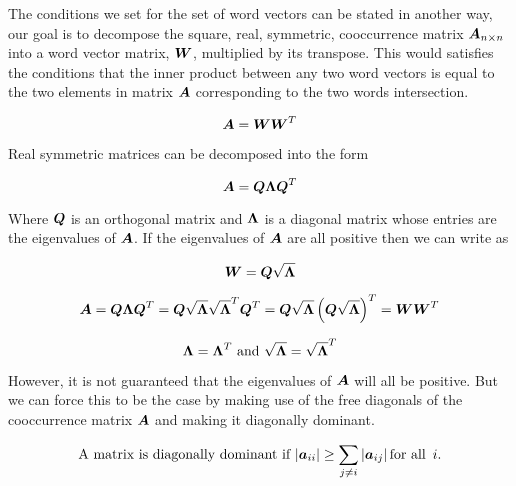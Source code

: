 \documentclass{article}
\begin{document}
%
%

The conditions we set for the set of word vectors can be stated in another way, our goal is to decompose the square, real, symmetric, cooccurrence matrix $\boldsymbol{{A}}_{{n} \times {n}}$ into a word vector matrix, $\boldsymbol{W}$, multiplied by its transpose. This would satisfies the conditions that the inner product between any two word vectors is equal to the two elements in matrix $\boldsymbol{A}$ corresponding to the two words intersection.

\begin{equation*}
\boldsymbol{A} = \boldsymbol{W}\boldsymbol{W}^T
\end{equation*}

Real symmetric matrices can be decomposed into the form

\begin{equation*}
\boldsymbol{A} = \boldsymbol{Q}\boldsymbol{\Lambda}\boldsymbol{Q}^T
\end{equation*}

Where $\boldsymbol{Q}$ is an orthogonal matrix and $\boldsymbol{\Lambda}$ is a diagonal matrix whose entries are the eigenvalues of $\boldsymbol{A}$. If the eigenvalues of $\boldsymbol{A}$ are all positive then we can write as

\begin{equation*}
\boldsymbol{W} = \boldsymbol{Q} \sqrt{\boldsymbol{\Lambda}}
\end{equation*}

\begin{equation*}
\boldsymbol{A} = \boldsymbol{Q}\boldsymbol{\Lambda}\boldsymbol{Q}^T =  \boldsymbol{Q} \sqrt{\boldsymbol{\Lambda}} \sqrt{\boldsymbol{\Lambda}}^T \boldsymbol{Q}^T = \boldsymbol{Q} \sqrt{\boldsymbol{\Lambda}} \left( \boldsymbol{Q} \sqrt{\boldsymbol{\Lambda}} \right)^T = \boldsymbol{W}\boldsymbol{W}^T
\end{equation*}

\begin{equation*}
\text{$\boldsymbol{\Lambda} = \boldsymbol{\Lambda}^T$ and $\sqrt{\boldsymbol{\Lambda}} = \sqrt{\boldsymbol{\Lambda}}^T$}
\end{equation*}

However, it is not guaranteed that the eigenvalues of $\boldsymbol{A}$ will all be positive. But we can force this to be the case by making use of the free diagonals of the cooccurrence matrix $\boldsymbol{A}$ and making it diagonally dominant.

\begin{equation*}
\text{A matrix is diagonally dominant if }
\lvert \boldsymbol{a}_{ii} \rvert \geq \sum_{j \neq i}{\lvert \boldsymbol{a}_{ij} \rvert} \, \text{for all } \, i \text{.}
\end{equation*}
\end{document}
